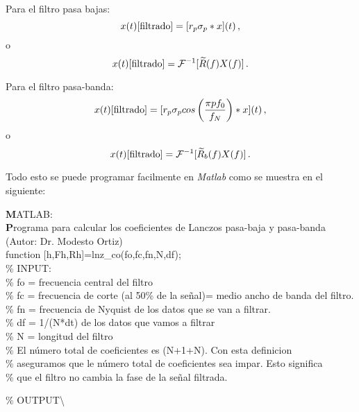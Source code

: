 \documentclass[
]{agujournal2019}
\begin{document}
Para el filtro pasa bajas:
\[x(t)[{\rm filtrado}]=[r_p \sigma_p * x](t)\,,\] o
\[x(t)[{\rm filtrado}]={\cal F}^{-1}[\widetilde{R}(f)X(f)]\,.\]

Para el filtro pasa-banda:
\[x(t)[{\rm filtrado}]=[r_p \sigma_p cos\left( \frac{\pi p f_0}{f_N}\right)*x](t)\,,\]
o \[x(t)[{\rm filtrado}]={\cal F}^{-1}[\widetilde{R}_b(f)X(f)]\,.\]

Todo esto se puede programar facilmente en \emph{Matlab} como se muestra
en el siguiente:

\begin{framed}
{\noindent \textbf MATLAB:}\\
{\textbf Programa para calcular los coeficientes de Lanczos pasa-baja y pasa-banda (Autor: Dr. Modesto Ortiz)}\\
{\noindent}function [h,Fh,Rh]=lnz\_co(fo,fc,fn,N,df);\\
\% INPUT:\\
\% fo = frecuencia central del filtro\\
\% fc = frecuencia de corte (al 50\% de la señal)= medio ancho de banda del filtro.\\
\% fn = frecuencia de Nyquist de los datos que se van a filtrar.\\
\% df = 1/(N*dt) de los datos que vamos a filtrar\\
\% N  = longitud del filtro\\
\% El número total de coeficientes es (N+1+N). Con esta definicion\\
\% aseguramos que le número total de coeficientes sea impar. Esto significa\\
\% que el filtro no cambia la fase de la señal filtrada.\\
\end{framed}

\% OUTPUT\textbackslash{}
\end{document}
